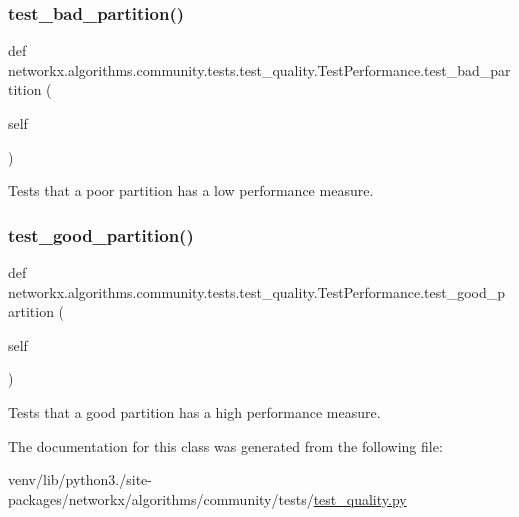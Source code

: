 \subsubsection{\texorpdfstring{test\+\_\+bad\+\_\+partition()}{test\_bad\_partition()}}
{\footnotesize\ttfamily def networkx.\+algorithms.\+community.\+tests.\+test\+\_\+quality.\+Test\+Performance.\+test\+\_\+bad\+\_\+partition (\begin{DoxyParamCaption}\item[{}]{self }\end{DoxyParamCaption})}

\begin{DoxyVerb}Tests that a poor partition has a low performance measure.\end{DoxyVerb}
 \mbox{\label{classnetworkx_1_1algorithms_1_1community_1_1tests_1_1test__quality_1_1TestPerformance_aaa8643138cfc012d5ae7d69ca6ef2914}} 
\subsubsection{\texorpdfstring{test\+\_\+good\+\_\+partition()}{test\_good\_partition()}}
{\footnotesize\ttfamily def networkx.\+algorithms.\+community.\+tests.\+test\+\_\+quality.\+Test\+Performance.\+test\+\_\+good\+\_\+partition (\begin{DoxyParamCaption}\item[{}]{self }\end{DoxyParamCaption})}

\begin{DoxyVerb}Tests that a good partition has a high performance measure.\end{DoxyVerb}
 

The documentation for this class was generated from the following file\+:\begin{DoxyCompactItemize}
\item 
venv/lib/python3./site-\/packages/networkx/algorithms/community/tests/\hyperlink{test__quality_8py}{test\+\_\+quality.\+py}\end{DoxyCompactItemize}
